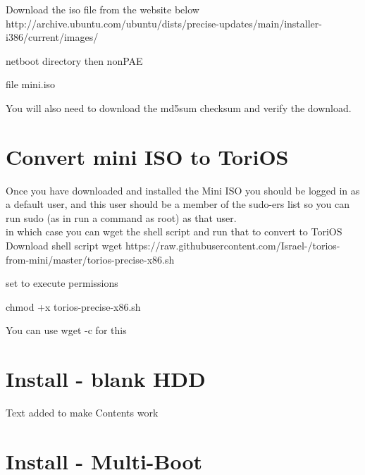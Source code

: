 \documentclass[12pt,a4paper]{book}
\begin{document}
Download the iso file from the website below \\

http://archive.ubuntu.com/ubuntu/dists/precise-updates/main/installer-i386/current/images/

netboot directory then nonPAE

file mini.iso

You will also need to download the md5sum checksum and verify the download. 

\chapter{Convert mini ISO to ToriOS}

Once you have downloaded and installed the Mini ISO you should be logged in as a default user,  and this user should be a member of the sudo-ers list so you can run sudo (as in run a command as root) as that user. \\
in which case you can wget the shell script and run that to convert to ToriOS\\

Download shell script
wget https://raw.githubusercontent.com/Israel-/torios-from-mini/master/torios-precise-x86.sh

set to execute permissions

chmod +x torios-precise-x86.sh


You can use wget -c for this
\chapter{Install - blank HDD}
Text added to make Contents work

\chapter{Install - Multi-Boot} 




\printindex
\end{document}
